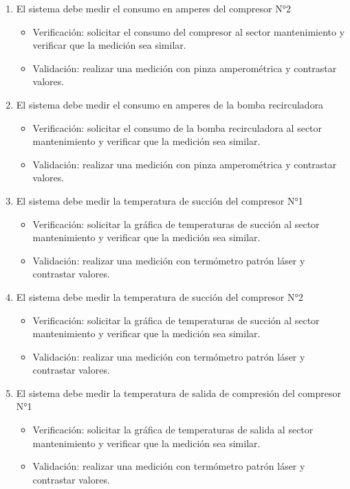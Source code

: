 \documentclass[
11pt, %
]{charter}
\begin{document}
\begin{enumerate}
\begin{enumerate}
\begin{itemize}
			\end{itemize}
			\item El sistema debe medir el consumo en amperes del compresor N°2
			\begin{itemize}
				\item Verificación: solicitar el consumo del compresor al sector mantenimiento y verificar que la medición sea similar.
				\item Validación: realizar una medición con pinza amperométrica y contrastar valores.
			\end{itemize}
			\item El sistema debe medir el consumo en amperes de la bomba recirculadora
			\begin{itemize}
				\item Verificación: solicitar el consumo de la bomba recirculadora al sector mantenimiento y verificar que la medición sea similar.
				\item Validación: realizar una medición con pinza amperométrica y contrastar valores.
			\end{itemize}
			\item El sistema debe medir la temperatura de succión del compresor N°1
			\begin{itemize}
				\item Verificación: solicitar la gráfica de temperaturas de succión al sector mantenimiento y verificar que la medición sea similar.
				\item Validación: realizar una medición con termómetro patrón láser y contrastar valores.
			\end{itemize}
			\item El sistema debe medir la temperatura de succión del compresor N°2
			\begin{itemize}
				\item Verificación: solicitar la gráfica de temperaturas de succión al sector mantenimiento y verificar que la medición sea similar.
				\item Validación: realizar una medición con termómetro patrón láser y contrastar valores.
			\end{itemize}
			\item El sistema debe medir la temperatura de salida de compresión del compresor N°1
			\begin{itemize}
				\item Verificación: solicitar la gráfica de temperaturas de salida al sector mantenimiento y verificar que la medición sea similar.
				\item Validación: realizar una medición con termómetro patrón láser y contrastar valores.

\end{itemize}
\end{enumerate}
\end{enumerate}
\end{document}
